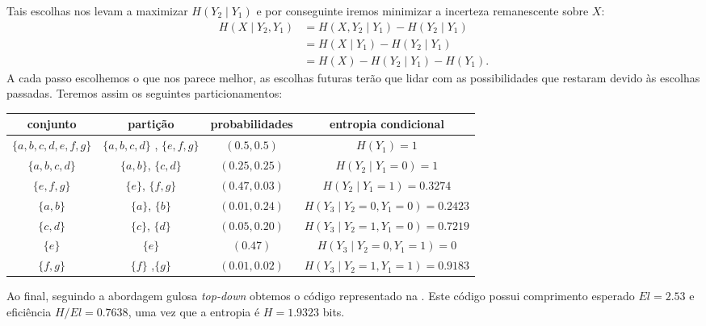 \begin{example}
  Tais escolhas nos levam a maximizar $H(Y_2 \mid Y_1)$ e por conseguinte iremos minimizar
  a incerteza remanescente sobre $X$:
  \begin{subequations}
    \begin{align}
      H(X \mid Y_2, Y_1) &= H(X,Y_2 \mid Y_1) - H(Y_2 \mid Y_1) \\
                         &= H(X \mid Y_1) - H(Y_2 \mid Y_1) \\
                         &= H(X) - H(Y_2 \mid Y_1) - H(Y_1) .
    \end{align}
  \end{subequations}
  A cada passo escolhemos o que nos parece melhor, as escolhas futuras terão que lidar
  com as possibilidades que restaram devido às escolhas passadas.
  Teremos assim os seguintes particionamentos:\\
  \begin{center}
    \begin{scriptsize}
      \begin{tabular}{c|c|c|c}
        conjunto          & partição & probabilidades & entropia condicional \\ \hline
        $\{a,b,c,d,e,f,g\}$     & $\{a,b,c,d\}$ , $\{e,f,g\}$   & $(0.5, 0.5)$          & $H(Y_1) = 1$ \\ \hline
        $\{a,b,c,d\}$           & $\{a,b\}$, $\{c,d\}$          & $(0.25, 0.25)$        & $H(Y_2 \mid Y_1 = 0) = 1$ \\ \hline
        $\{e,f,g\}$             & $\{e\}$, $\{f,g\}$            & $(0.47, 0.03)$        & $H(Y_2 \mid Y_1 = 1) = 0.3274$ \\ \hline
        $\{a,b\}$               & $\{a\}$, $\{b\}$              & $(0.01, 0.24)$        & $H(Y_3 \mid Y_2 = 0, Y_1 = 0) = 0.2423$ \\ \hline
        $\{c,d\}$               & $\{c\}$, $\{d\}$              & $(0.05, 0.20)$        & $H(Y_3 \mid Y_2 = 1, Y_1 = 0) = 0.7219$ \\ \hline
        $\{e\}$                 & $\{e\}$                       & $(0.47)$              & $H(Y_3 \mid Y_2 = 0, Y_1 = 1) = 0$ \\ \hline
        $\{f,g\}$               & $\{f\}$ ,$\{g\}$              & $(0.01, 0.02)$        & $H(Y_3 \mid Y_2 = 1, Y_1 = 1) = 0.9183$
        \end{tabular}
      \end{scriptsize}
  \end{center}

  Ao final, seguindo a abordagem gulosa \emph{top-down} obtemos o código representado
  na . Este código possui comprimento esperado $E l = 2.53$ e 
  eficiência $H/E l = 0.7638$, uma vez que a entropia é $H=1.9323$ bits.


\end{example}
